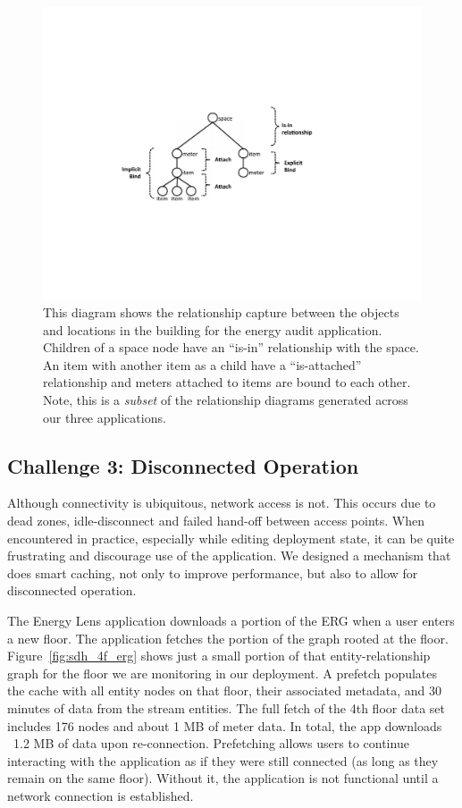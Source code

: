 \begin{figure}[htb!]
\begin{center}
\includegraphics[scale=0.75]{figs/bindattachstructs}
\caption{This diagram shows the relationship capture between the objects and locations in the building for the 
energy audit application.  Children of a space node have an ``is-in'' relationship with the space.  An item
with another item as a child have a ``is-attached'' relationship and meters attached to items are bound to each other.
Note, this is a \emph{subset} of the relationship diagrams generated across our three applications.}
\label{fig:attachandbind}
\end{center}
\end{figure}





\subsection{Challenge 3: Disconnected Operation}
Although connectivity is ubiquitous, network access is not.  This occurs due to dead zones, 
idle-disconnect and failed hand-off between access points.  When encountered in practice, especially while editing
deployment state, it can be quite frustrating and discourage use of the application.  We designed a
mechanism that does smart caching, not only to improve performance, but also to allow for disconnected operation.

The Energy Lens application downloads a portion of the ERG when a user enters a new floor.  The application fetches the portion
of the graph rooted at the floor.  
Figure~\ref{fig:sdh_4f_erg} shows just a small portion of that entity-relationship graph for the floor we are monitoring in
our deployment.  
A prefetch populates the cache with all entity nodes on that floor, their associated metadata,
and 30 minutes of data from the stream entities.  The full fetch of the 4th floor data set includes
176 nodes and about 1 MB of meter data.  In total, the app downloads ~1.2 MB of data upon re-connection.
Prefetching allows users to continue interacting with the application as if they were still connected (as long as they remain on
the same floor).  Without it, the application is not functional until a network connection is established.

